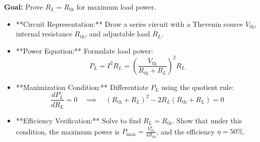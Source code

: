 \documentclass[11pt,a4paper]{article}
\begin{document}
\vspace{0.8cm}

\begin{prioritybox}
    \textbf{Goal:} Prove $R_L = R_{\text{th}}$ for maximum load power.
    \begin{itemize}
        \item[\textbf{1.}] **Circuit Representation:** Draw a series circuit with a Thevenin source $V_{\text{th}}$, internal resistance $R_{\text{th}}$, and adjustable load $R_L$.
        \item[\textbf{2.}] **Power Equation:** Formulate load power:
        \[ P_L = I^2 R_L = \left( \frac{V_{\text{th}}}{R_{\text{th}} + R_L} \right)^2 R_L \]
        \item[\textbf{3.}] **Maximization Condition:** Differentiate $P_L$ using the quotient rule:
        \[ \frac{dP_L}{dR_L} = 0 \quad \implies \quad (R_{\text{th}} + R_L)^2 - 2R_L(R_{\text{th}} + R_L) = 0 \]
        \item[\textbf{4.}] **Efficiency Verification:** Solve to find $R_L = R_{\text{th}}$. Show that under this condition, the maximum power is $P_{\text{max}} = \frac{V_{\text{th}}^2}{4R_{\text{th}}}$, and the efficiency $\eta = 50\%$.
    \end{itemize}
\end{prioritybox}
\end{document}
